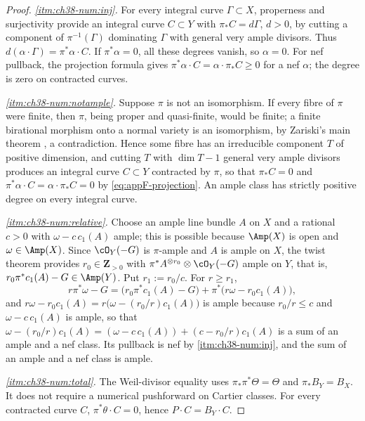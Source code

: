 \begin{proof}
\emph{\cref{itm:ch38-num:inj}.} For every integral curve
$\Gamma\subset X$, properness and surjectivity provide an integral
curve $C\subset Y$ with $\pi_*C=d\Gamma$, $d>0$, by cutting a
component of $\pi^{-1}(\Gamma)$ dominating $\Gamma$ with general
very ample divisors. Thus
$d(\alpha\cdot\Gamma)=\pi^*\alpha\cdot C$.
If $\pi^*\alpha=0$, all these degrees vanish, so $\alpha=0$.
For nef pullback, the projection formula gives
$\pi^*\alpha\cdot C=\alpha\cdot\pi_*C\geq0$ for a nef $\alpha$;
the degree is zero on contracted curves.

\emph{\cref{itm:ch38-num:notample}.}  Suppose $\pi$ is not an
isomorphism.  If every fibre of $\pi$ were finite, then $\pi$, being
proper and quasi-finite, would be finite; a finite birational morphism onto
a normal variety is an isomorphism, by Zariski's main theorem
\cite[Corollary~III.11.4]{Har}, a contradiction.  Hence some fibre has an
irreducible component $T$ of positive dimension, and cutting $T$ with
$\dim T-1$ general very ample divisors produces an integral curve
$C\subset Y$ contracted by $\pi$, so that
$\pi_*C=0$ and $\pi^*\alpha\cdot C=\alpha\cdot\pi_*C=0$ by
\eqref{eq:appF-projection}.  An ample class has strictly positive degree on
every integral curve.

\emph{\cref{itm:ch38-num:relative}.}  Choose an ample line bundle $A$ on
$X$ and a rational $c>0$ with $\omega-c\,c_1(A)$ ample; this is
possible because $\Amp(X)$ is open and $\omega\in\Amp(X)$.  Since
$\cO_Y(-G)$ is $\pi$-ample and $A$ is ample on $X$, the twist
theorem \cite[4.6.13]{EGAII} provides $r_0\in\mathbf Z_{>0}$ with
$\pi^*A^{\otimes r_0}\otimes\cO_Y(-G)$ ample on $Y$, that is,
$r_0\pi^*c_1(A)-G\in\Amp(Y)$.  Put $r_1:=r_0/c$.  For $r\geq r_1$,
\[
 r\pi^*\omega-G
 =\bigl(r_0\pi^*c_1(A)-G\bigr)
  +\pi^*\bigl(r\omega-r_0c_1(A)\bigr),
\]
and $r\omega-r_0c_1(A)=r\bigl(\omega-(r_0/r)c_1(A)\bigr)$ is ample
because $r_0/r\leq c$ and $\omega-c\,c_1(A)$ is ample, so that
$\omega-(r_0/r)c_1(A)
=(\omega-c\,c_1(A))+(c-r_0/r)c_1(A)$ is a sum of an ample and a nef class.
Its pullback is nef by \cref{itm:ch38-num:inj}, and the sum of an ample and
a nef class is ample.

\emph{\cref{itm:ch38-num:total}.} The Weil-divisor equality uses
$\pi_*\pi^*\Theta=\Theta$ and $\pi_*B_Y=B_X$. It does not require
a numerical pushforward on Cartier classes. For every contracted
curve $C$, $\pi^*\theta\cdot C=0$, hence
$P\cdot C=B_Y\cdot C$.
\end{proof}

